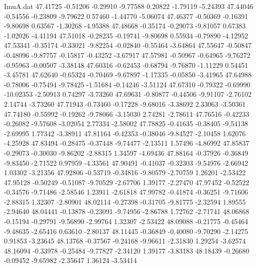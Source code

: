 \begin{filecontents}{ImuA.dat}
  47.41725   -0.51206   -0.29910   -9.77588    0.20822   -1.79119   -5.24393
  47.44046   -0.54556   -0.23809   -9.79622    0.57460   -1.44770   -5.06074
  47.46377   -0.50369   -0.16391   -9.80698    0.63567   -1.30268   -4.95388
  47.48668   -0.35174   -0.29073   -9.81057    0.67383   -1.02026   -4.41194
  47.51018   -0.28235   -0.19741   -9.80698    0.55934   -0.79890   -4.12952
  47.53341   -0.35174   -0.33021   -9.82254   -0.02840   -0.55464   -3.64864
  47.55647   -0.50847   -0.48096   -9.87757   -0.15817   -0.43252   -3.67917
  47.57981   -0.50967   -0.64965   -9.76272   -0.95963   -0.00507   -3.38148
  47.60316   -0.62453   -0.68794   -9.76870   -1.11229    0.54451   -3.45781
  47.62640   -0.65324   -0.70469   -9.67897   -1.17335   -0.05850   -3.41965
  47.64988   -0.78006   -0.75494   -9.78425   -1.51684   -0.14246   -3.51124
  47.67310   -0.79322   -0.69990  -10.02353   -2.50913    0.74297   -3.73260
  47.69631   -0.80877   -0.44506   -9.91107   -2.76102    2.14744   -3.73260
  47.71943   -0.73460   -0.17228   -9.68016   -3.38692    2.33063   -3.50361
  47.74180   -0.55992   -0.19262   -9.78066   -3.15030    2.74281   -2.78611
  47.76516   -0.42233   -0.26082   -9.57608   -3.02054    2.77334   -2.58002
  47.78825   -0.41635   -0.38405   -9.54138   -2.69995    1.77342   -3.38911
  47.81164   -0.42353   -0.38046   -9.84527   -2.10458    1.62076   -4.25928
  47.83494   -0.28475   -0.37448   -9.74477   -2.13511    1.57496   -4.86992
  47.85837   -0.29073   -0.30030   -9.86202   -2.88315    1.34597   -4.69436
  47.88164   -0.37926   -0.36849   -9.83450   -2.71522    0.97959   -4.33561
  47.90491   -0.41037   -0.32303   -9.54976   -2.66942    1.03302   -3.21356
  47.92806   -0.53719   -0.34816   -9.80579   -2.70759    1.26201   -2.53422
  47.95128   -0.50249   -0.51087   -9.70529   -2.67706    1.39177   -2.27470
  47.97452   -0.52522   -0.34576   -9.71486   -2.58546    1.23911   -2.61818
  47.99782   -0.41874   -0.36251   -9.71606   -2.88315    1.32307   -2.80901
  48.02114   -0.27398   -0.31705   -9.81775   -2.32594    1.89555   -2.94640
  48.04441   -0.13878   -0.23091   -9.74956   -2.86788    1.72762   -2.71741
  48.06868   -0.15194   -0.29791   -9.56890   -2.99764    1.32307   -2.53422
  48.09088   -0.21775   -0.45464   -9.48635   -2.65416    0.63610   -2.80137
  48.11445   -0.36849   -0.40080   -9.70290   -2.14275    0.91853   -3.23645
  48.13768   -0.37567   -0.24168   -9.96611   -2.31830    1.29254   -3.62574
  48.16094   -0.33978   -0.25484   -9.77827   -2.34120    1.39177   -3.83183
  48.18439   -0.26680   -0.09452   -9.65982   -2.35647    1.36124   -3.53414

\end{filecontents}
